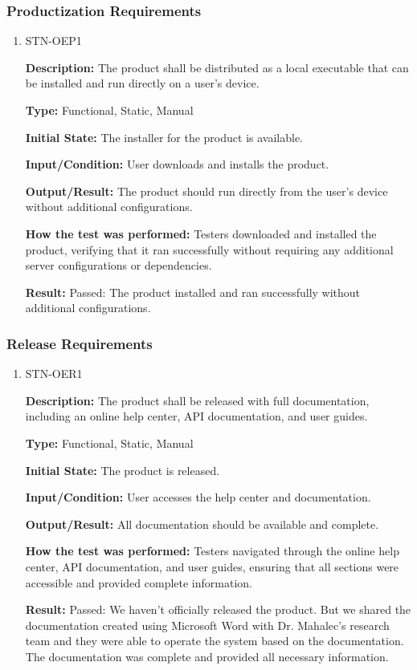 \documentclass[12pt, titlepage]{article}
\begin{document}
\subsubsection{Productization Requirements}

\begin{enumerate}

\item{STN-OEP1\\}

\textbf{Description:} The product shall be distributed as a local executable that can be installed and run directly on a user’s device.

\textbf{Type:} Functional, Static, Manual

\textbf{Initial State:} The installer for the product is available.

\textbf{Input/Condition:} User downloads and installs the product.

\textbf{Output/Result:} The product should run directly from the user’s device without additional configurations.

\textbf{How the test was performed:} Testers downloaded and installed the product, verifying that it ran successfully without requiring any additional server configurations or dependencies.

\textbf{Result:} Passed: The product installed and ran successfully without additional configurations.

\end{enumerate}

\subsubsection{Release Requirements}

\begin{enumerate}

\item{STN-OER1\\}

\textbf{Description:} The product shall be released with full documentation, including an online help center, API documentation, and user guides.

\textbf{Type:} Functional, Static, Manual

\textbf{Initial State:} The product is released.

\textbf{Input/Condition:} User accesses the help center and documentation.

\textbf{Output/Result:} All documentation should be available and complete.

\textbf{How the test was performed:} Testers navigated through the online help center, API documentation, and user guides, ensuring that all sections were accessible and provided complete information.

\textbf{Result:} Passed: We haven't officially released the product. But we shared the documentation created using Microsoft Word with Dr. Mahalec's research team and they were able to operate the system based on the documentation. The documentation was complete and provided all necessary information.

\end{enumerate}
\end{document}
